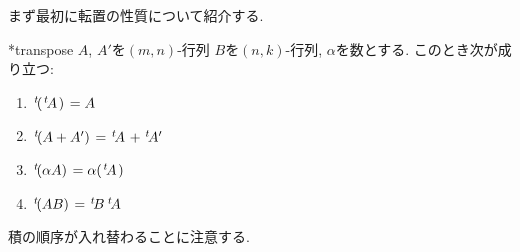 まず最初に転置の性質について紹介する.
\begin{prop}
  \provelater**{transpose}
  $A$, $A'$を$(m,n)$-行列
  $B$を$(n,k)$-行列,
  $\alpha$を数とする.
  このとき次が成り立つ:
  \begin{enumerate}
  \item {}
    ${\left.^{t}\!({\left.^{t}\!A\right.})\right.}=A$
  \item {}
    ${\left.^{t}\!(A+A')\right.}={\left.^{t}\!A\right.}+{\left.^{t}\!A'\right.}$
  \item {}
    ${\left.^{t}\!(\alpha A)\right.}=\alpha({\left.^{t}\!A\right.})$
  \item {}
    ${\left.^{t}\!(AB)\right.}={\left.^{t}\!B\right.}{\left.^{t}\!A\right.}$
  \end{enumerate}
\end{prop}

\begin{remark}
  積の順序が入れ替わることに注意する.
\end{remark}

